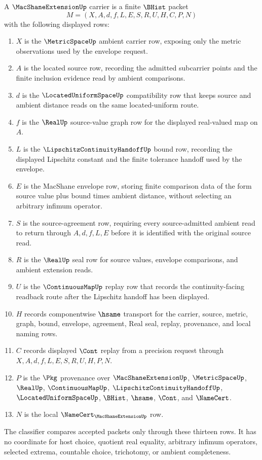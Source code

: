 \begin{definition}
\label{def:macshane-extension-carrier}
A $\MacShaneExtensionUp$ carrier is a finite $\BHist$ packet
$$
M=(X,A,d,f,L,E,S,R,U,H,C,P,N)
$$
with the following displayed rows:
\begin{enumerate}
\item $X$ is the $\MetricSpaceUp$ ambient carrier row, exposing only the metric observations used by the envelope request.
\item $A$ is the located source row, recording the admitted subcarrier points and the finite inclusion evidence read by ambient comparisons.
\item $d$ is the $\LocatedUniformSpaceUp$ compatibility row that keeps source and ambient distance reads on the same located-uniform route.
\item $f$ is the $\RealUp$ source-value graph row for the displayed real-valued map on $A$.
\item $L$ is the $\LipschitzContinuityHandoffUp$ bound row, recording the displayed Lipschitz constant and the finite tolerance handoff used by the envelope.
\item $E$ is the MacShane envelope row, storing finite comparison data of the form source value plus bound times ambient distance, without selecting an arbitrary infimum operator.
\item $S$ is the source-agreement row, requiring every source-admitted ambient read to return through $A,d,f,L,E$ before it is identified with the original source read.
\item $R$ is the $\RealUp$ seal row for source values, envelope comparisons, and ambient extension reads.
\item $U$ is the $\ContinuousMapUp$ replay row that records the continuity-facing readback route after the Lipschitz handoff has been displayed.
\item $H$ records componentwise $\hsame$ transport for the carrier, source, metric, graph, bound, envelope, agreement, Real seal, replay, provenance, and local naming rows.
\item $C$ records displayed $\Cont$ replay from a precision request through $X,A,d,f,L,E,S,R,U,H,P,N$.
\item $P$ is the $\Pkg$ provenance over $\MacShaneExtensionUp$, $\MetricSpaceUp$, $\RealUp$, $\ContinuousMapUp$, $\LipschitzContinuityHandoffUp$, $\LocatedUniformSpaceUp$, $\BHist$, $\hsame$, $\Cont$, and $\NameCert$.
\item $N$ is the local $\NameCert_{\MacShaneExtensionUp}$ row.
\end{enumerate}
The classifier compares accepted packets only through these thirteen rows. It has no coordinate for host choice, quotient real equality, arbitrary infimum operators, selected extrema, countable choice, trichotomy, or ambient completeness.
\end{definition}

